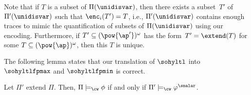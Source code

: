 Note that if $T$ is a subset of $\Pi(\unidisvar)$, then there exists a subset~$T'$ of $\Pi'(\unidisvar)$ such that $\enc_i(T') = T$, i.e., $\Pi'(\unidisvar)$ contains enough traces to mimic the quantification of subsets of $\Pi(\unidisvar)$ using our encoding.
Furthermore, if $T' \subseteq (\pow{\ap'})^\omega$  has the form~$T' = \extend(T)$ for some $T \subseteq (\pow{\ap})^\omega$, then this $T$ is unique.

The following lemma states that our translation of $\sohyltl$ into $\sohyltlfpmax$ and $\sohyltlfpmin$ is correct. 

\begin{lem}
\label{lemma_mmcorrectness}
Let $\Pi'$ extend $\Pi$. Then, $\Pi \models_\cw \phi$ if and only if $\Pi' \models_\cw \varphi^{\smalar}$.
\end{lem}

